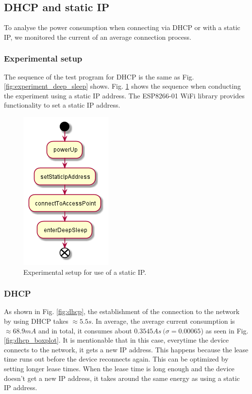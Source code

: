 \subsection{DHCP and static IP}
To analyse the power consumption when connecting via DHCP or with a static IP, we monitored the current of an average connection process.\\

\subsubsection{Experimental setup}
The sequence of the test program for DHCP is the same as Fig. \ref{fig:experiment_deep_sleep} shows.
Fig. \ref{fig:experiment_static_ip} shows the sequence when conducting the experiment using a static IP address.
The ESP8266-01 WiFi library provides functionality to set a static IP address.
\begin{figure}[H]
    \centering
    \includegraphics[width = 0.35 \linewidth]{fig/sequence_static_ip.png}
    \caption{Experimental setup for use of a static IP.}
    \label{fig:experiment_static_ip}
\end{figure}

\subsubsection{DHCP}
As shown in Fig. \ref{fig:dhcp}, the establishment of the connection to the network by using DHCP takes $\approx 5.5 s$.
In average, the average current consumption is $\approx 68.9 mA$ and in total, it consumes about $0.3545 As\ (\sigma = 0.00065$) as seen in Fig. \ref{fig:dhcp_boxplot}.
It is mentionable that in this case, everytime the device connects to the network, it gets a new IP address.
This happens because the lease time runs out before the device reconnects again.
This can be optimized by setting longer lease times.
When the lease time is long enough and the device doesn't get a new IP address, it takes around the same energy as using a static IP address.\\

